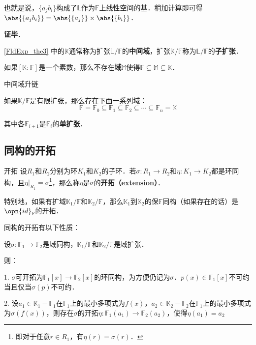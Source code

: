 也就是说，$\{a_jb_i\}$构成了$\mathbb{L}$作为$\mathbb{F}$上线性空间的基．稍加计算即可得$\abs{\{a_jb_i\}}=\abs{\{a_j\}}\times\abs{\{b_i\}}$．





\textbf{证毕}．


\autoref{FldExp_the3} 中的$\mathbb{K}$通常称为扩张$\mathbb{L}/\mathbb{F}$的\textbf{中间域}，扩张$\mathbb{K}/\mathbb{F}$称为$\mathbb{L}/\mathbb{F}$的\textbf{子扩张}．






\begin{corollary}{}
如果$[\mathbb{K}:\mathbb{F}]$是一个素数，那么不存在\textbf{域}$\mathbb{M}$使得$\mathbb{F}\subsetneq\mathbb{M}\subsetneq\mathbb{K}$．
\end{corollary}


\begin{corollary}{中间域升链}

如果$\mathbb{K}/\mathbb{F}$是有限扩张，那么存在下面一系列域：
\begin{equation}
\mathbb{F}=\mathbb{F}_0\subseteq\mathbb{F}_1\subseteq\mathbb{F}_2\subseteq\cdots\subseteq\mathbb{F}_n=\mathbb{K}
\end{equation}

其中各$\mathbb{F}_{i+1}$是$\mathbb{F}_i$的\textbf{单扩张}．

\end{corollary}





\subsection{同构的开拓}

\begin{definition}{开拓}\label{FldExp_def6}
设$R_1$和$R_2$分别为环$K_1$和$K_2$的子环．若$\sigma:R_1\to R_2$和$\eta:K_1\to K_2$都是环同构，且$\eta|_{R_1}=\sigma$\footnote{即对于任意$r\in R_1$，有$\eta(r)=\sigma(r)$．}，那么称$\eta$是$\sigma$的\textbf{开拓（extension）}．
\end{definition}

特别地，如果有扩域$\mathbb{K}_1/\mathbb{F}$和$\mathbb{K}_2/\mathbb{F}$，那么$\mathbb{K}_1$到$\mathbb{K}_2$的保$\mathbb{F}$同构（如果存在的话）是$\opn{id}_\mathbb{F}$的开拓．

同构的开拓有以下性质：

\begin{theorem}{}\label{FldExp_the4}
设$\sigma:\mathbb{F}_1\to\mathbb{F}_2$是域同构，$\mathbb{K}_1/\mathbb{F}$和$\mathbb{K}_2/\mathbb{F}$是域扩张．

则：

1. $\sigma$可开拓为$\mathbb{F}_1[x]\to\mathbb{F}_2[x]$的环同构，为方便仍记为$\sigma$．$p(x)\in\mathbb{F}_1[x]$不可约当且仅当$\sigma(p)$不可约．

2. 设$a_1\in\mathbb{K}_1-\mathbb{F}_1$在$\mathbb{F}_1$上的最小多项式为$f(x)$，$a_2\in\mathbb{K}_2-\mathbb{F}_2$在$\mathbb{F}_1$上的最小多项式为$\sigma(f(x))$，则存在$\sigma$的开拓$\eta:\mathbb{F}_1(a_1)\to \mathbb{F}_2(a_2)$，使得$\eta(a_1)=a_2$
\end{theorem}

